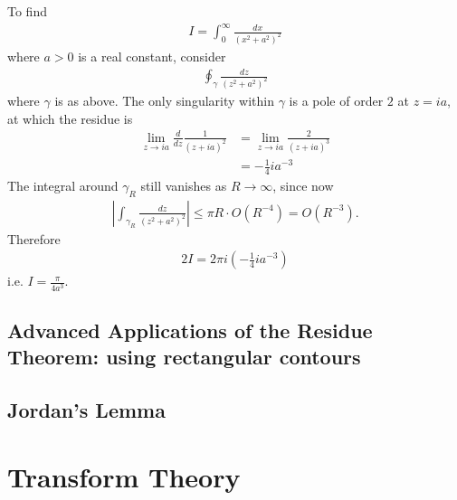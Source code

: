 \documentclass[a4paper]{article}
\begin{document}
\begin{eg}
To find
\begin{equation*}
\begin{aligned}
I = \int_0^\infty \frac{dx}{(x^2+a^2)^2}
\end{aligned}
\end{equation*}
where $a>0$ is a real constant, consider
\begin{equation*}
\begin{aligned}
\oint_\gamma \frac{dz}{(z^2+a^2)^2}
\end{aligned}
\end{equation*}
where $\gamma$ is as above. The only singularity within $\gamma$ is a pole of order $2$ at $z=ia$, at which the residue is
\begin{equation*}
\begin{aligned}
\lim_{z \to ia} \frac{d}{dz} \frac{1}{(z+ia)^2} &= \lim_{z \to ia}\frac{2}{(z+ia)^3} \\
&= -\frac{1}{4} ia^{-3}
\end{aligned}
\end{equation*}
The integral around $\gamma_R$ still vanishes as $R \to \infty$, since now
\begin{equation*}
\begin{aligned}
\left|\int_{\gamma_R} \frac{dz}{(z^2+a^2)^2}\right| \leq \pi R \cdot  O(R^{-4}) = O(R^{-3}).
\end{aligned}
\end{equation*}
Therefore
\begin{equation*}
\begin{aligned}
2I = 2\pi i (-\frac{1}{4} ia^{-3})
\end{aligned}
\end{equation*}
i.e. $I=\frac{\pi}{4a^3}$.
\end{eg}

\subsection{Advanced Applications of the Residue Theorem: using rectangular contours}

\subsection{Jordan's Lemma}

\newpage

\section{Transform Theory}
\end{document}
